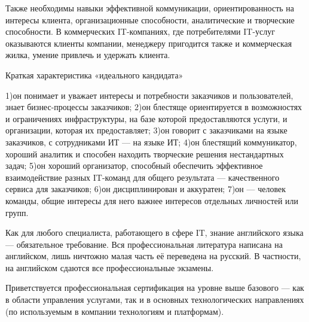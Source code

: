 \documentclass{../industrial-development}
\begin{document}
Также необходимы навыки эффективной коммуникации, ориентированность на интересы клиента, организационные способности, аналитические и творческие способности. В коммерческих IT-компаниях, где потребителями IT-услуг оказываются клиенты компании, менеджеру пригодится также и коммерческая жилка, умение привлечь и удержать клиента.

Краткая характеристика «идеального кандидата»

1)он понимает и уважает интересы и потребности заказчиков и пользователей, знает бизнес-процессы заказчиков;
2)он блестяще ориентируется в возможностях и ограничениях инфраструктуры, на базе которой предоставляются услуги, и организации, которая их предоставляет;
3)он говорит с заказчиками на языке заказчиков, с сотрудниками ИТ — на языке ИТ;
4)он блестящий коммуникатор, хороший аналитик и способен находить творческие решения нестандартных задач;
5)он хороший организатор, способный обеспечить эффективное взаимодействие разных IT-команд для общего результата — качественного сервиса для заказчиков;
6)он дисциплинирован и аккуратен;
7)он — человек команды, общие интересы для него важнее интересов отдельных личностей или групп.

Как для любого специалиста, работающего в сфере IT, знание английского языка — обязательное требование. Вся профессиональная литература написана на английском, лишь ничтожно малая часть её переведена на русский. В частности, на английском сдаются все профессиональные экзамены.

Приветствуется профессиональная сертификация на уровне выше базового — как в области управления услугами, так и в основных технологических направлениях (по используемым в компании технологиям и платформам).
\end{document}
